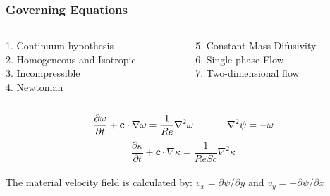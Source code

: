 
\begin{frame} 
 \frametitle{\LARGE Governing Equations}
\vspace{-1cm}
\begin{center}
\begin{columns}[c]
\begin{column}{0.6\textwidth} 
\hspace{1cm}  1. Continuum hypothesis\\[0.1cm]
\hspace{1cm}  2. Homogeneous and Isotropic\\[0.1cm]
\hspace{1cm}  3. Incompressible\\[0.1cm]
\hspace{1cm}  4. Newtonian
\end{column}
\begin{column}{0.6\textwidth}
\hspace{0.5cm}  5. Constant Mass Difusivity\\[0.1cm]
\hspace{0.5cm}  6. Single-phase Flow\\[0.1cm]
\hspace{0.5cm}  7. Two-dimensional flow
\end{column}
\end{columns}
\end{center}
\small
\vspace{0.5cm}
\begin{equation*}
 \frac{\partial \omega}{\partial t} + \textbf{c} \cdot \nabla \omega = \frac{1}{Re} \nabla^{2} \omega
 \hspace{1.2cm}
 \nabla^{2} \psi = - \omega
\end{equation*}
\vspace{0.2cm}
\begin{equation*}
 \frac{\partial \kappa}{\partial t} + \textbf{c} \cdot \nabla \kappa = \frac{1}{ReSc} \nabla^{2} \kappa
\end{equation*}\\[0.8cm]

\justifying
The material velocity field is calculated by: 
$v_{x} = \partial \psi / \partial y$ and 
$v_{y} = - \partial \psi / \partial x$

\end{frame}




